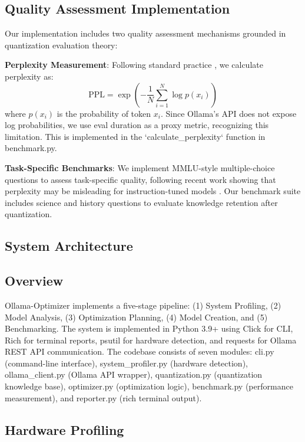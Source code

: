 \documentclass[journal]{IEEEtran}
\begin{document}
\subsection{Quality Assessment Implementation}

Our implementation includes two quality assessment mechanisms grounded in quantization evaluation theory:

\textbf{Perplexity Measurement}: Following standard practice \cite{frantar2022}, we calculate perplexity as:
\begin{equation}
\text{PPL} = \exp\left(-\frac{1}{N} \sum_{i=1}^{N} \log p(x_i)\right)
\end{equation}
where $p(x_i)$ is the probability of token $x_i$. Since Ollama's API does not expose log probabilities, we use eval duration as a proxy metric, recognizing this limitation. This is implemented in the `calculate_perplexity` function in benchmark.py.

\textbf{Task-Specific Benchmarks}: We implement MMLU-style multiple-choice questions to assess task-specific quality, following recent work showing that perplexity may be misleading for instruction-tuned models \cite{liu2024}. Our benchmark suite includes science and history questions to evaluate knowledge retention after quantization.

\subsection{System Architecture}

\subsection{Overview}

Ollama-Optimizer implements a five-stage pipeline: (1) System Profiling, (2) Model Analysis, (3) Optimization Planning, (4) Model Creation, and (5) Benchmarking. The system is implemented in Python 3.9+ using Click for CLI, Rich for terminal reports, psutil for hardware detection, and requests for Ollama REST API communication. The codebase consists of seven modules: cli.py (command-line interface), system\_profiler.py (hardware detection), ollama\_client.py (Ollama API wrapper), quantization.py (quantization knowledge base), optimizer.py (optimization logic), benchmark.py (performance measurement), and reporter.py (rich terminal output).

\subsection{Hardware Profiling}
\end{document}
